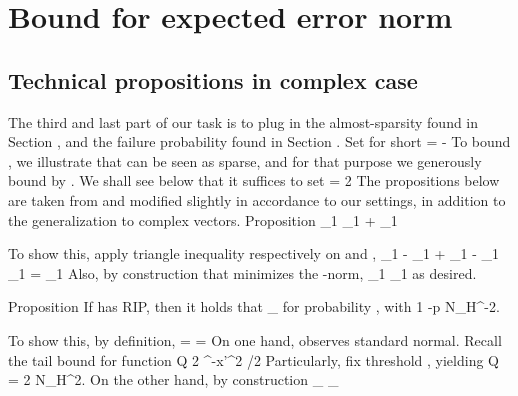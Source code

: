 \section {Bound for expected error norm}

\subsection {Technical propositions in complex case}

The third and last part of our task is to plug in the almost-sparsity found in Section , and the failure probability found in Section .
Set for short
%
 {
=  -  \NR
}
%
To bound , we illustrate that  can be seen as sparse, and for that purpose we generously bound  by .
We shall see below that it suffices to set
%
 {
\g
= 2  \NR
}
%
The propositions below are taken from \cite {CaT07} and modified slightly in accordance to our settings, in addition to the generalization to complex vectors.
%
\Result
{Proposition}
{
%
 {
 _1
\leq {} _1
+ _1 \NR
}
}

To show this, apply triangle inequality respectively on  and ,
%
 {
 _1
-  _1
+  _1
-  _1
\leq {} _1 \NR
%
= _1 \NR
}
%
Also, by construction that  minimizes the -norm,
%
 {
 _1
\leq {} _1 \NR
}
as desired.

%
\Result
{Proposition}
{
If  has  RIP, then it holds that
%
 {
 _\infty
{}  \NR
}
%
for probability , with
%
 {
1 -p
\leq N_H^{-2}. \NR
}
}

To show this, by definition,
%
 {
=  \NR
%
=  \NR
}
%
On one hand,  observes standard normal.
Recall the tail bound for  function
%
 {
Q
\leq {} {2} ^{-x'^2 /2} \NR
}
%
Particularly, fix threshold , yielding
%
 {
Q
= {2 N_H^2}. \NR
}
%
On the other hand, by construction
%
 {
 _\infty
\leq {} _\infty \NR
%
 \NR
}

